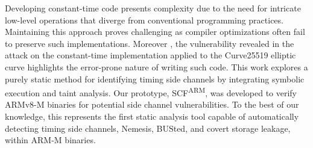 Developing constant-time code presents complexity due to the need for intricate low-level operations that diverge from conventional programming practices. Maintaining this approach proves challenging as compiler optimizations often fail to preserve such implementations. Moreover , the vulnerability revealed in the attack on the constant-time implementation applied to the Curve25519 elliptic curve \cite{kaufmann2016constanttime} highlights the error-prone nature of writing such code. This work explores a purely static method for identifying timing side channels by integrating symbolic execution and taint analysis. Our prototype, \ac{SCF}\textsuperscript{ARM}, was developed to verify ARMv8-M binaries for potential side channel vulnerabilities. To the best of our knowledge, this represents the first static analysis tool capable of automatically detecting timing side channels, Nemesis, BUSted, and covert storage leakage, within ARM-M binaries.
